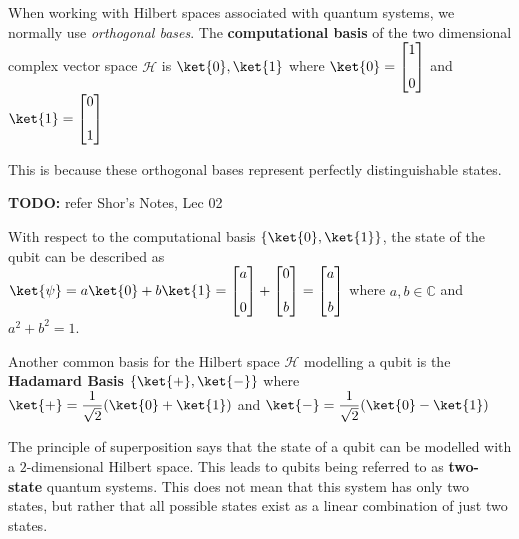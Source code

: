 \vspace*{0.5cm}
When working with Hilbert spaces associated with quantum systems, we normally use \textit{orthogonal bases}. The \textbf{computational basis} of the two dimensional complex vector space $\mathcal{H}$ is $\\{ \ket{0}, \ket{1} \\}$ where $\ket{0} = \begin{bmatrix} 1 \\\\ 0 \end{bmatrix}$ and $\ket{1} = \begin{bmatrix} 0 \\\\ 1 \end{bmatrix}$

This is because these orthogonal bases represent perfectly distinguishable states.

\textbf{TODO:} refer Shor's Notes, Lec 02

\begin{lemma}
With respect to the computational basis $\{ \ket{0}, \ket{1} \}$, the state of the qubit can be described as \\ 
    $\ket{\psi} = a \ket{0} + b \ket{1} = \begin{bmatrix} a \\\\ 0 \end{bmatrix} + \begin{bmatrix} 0 \\\\ b \end{bmatrix} = \begin{bmatrix} a \\\\ b \end{bmatrix} $ where $a, b \in \mathbb{C}$ and $a^2 + b^2 = 1$.
\end{lemma}
\vspace*{0.5cm}
Another common basis for the Hilbert space $\mathcal{H}$ modelling a qubit is the \textbf{Hadamard Basis} $\{ \ket{+}, \ket{-} \}$ where \\
$\ket{+} = \displaystyle\frac{1}{\sqrt 2} (\ket{0} + \ket{1})$ and $\ket{-} = \displaystyle\frac{1}{\sqrt 2} (\ket{0} - \ket{1})$

\vspace*{0.5cm}
The principle of superposition says that the state of a qubit can be modelled with a $2$-dimensional Hilbert space. This leads to qubits being referred to as \textbf{two-state} quantum systems. This does not mean that this system has only two states, but rather that all possible states exist as a linear combination of just two states.

